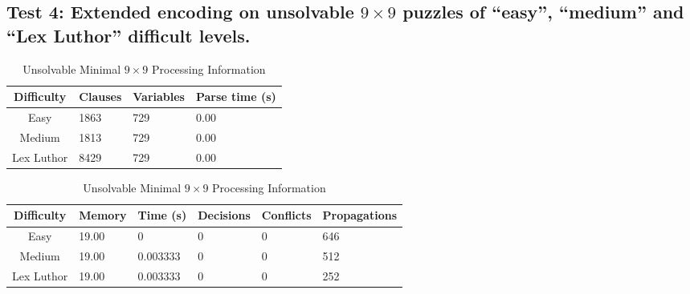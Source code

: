 \documentclass[conference,draftclsnofoot]{IEEEtran}
\begin{document}
\subsection{Test 4: Extended encoding on unsolvable $9 \times 9$ puzzles of ``easy'',
``medium'' and ``Lex Luthor'' difficult levels.}
\FloatBarrier
\begin{table}[!h]
	\centering
	\begin{tabular}{c | l l l}
		Difficulty & Clauses & Variables & Parse time (s) \\\hline
		Easy 		& 1863 & 729 & 0.00 \\
		Medium 		& 1813 & 729 & 0.00 \\
		Lex Luthor 	& 8429 & 729 & 0.00
	\end{tabular}
	\caption{Unsolvable Minimal $9 \times 9$ Parse Information}
	\label{tab:summary}
	\begin{tabular}{c | l l p{20pt} p{20pt}  l }
		Difficulty & Memory & Time (s) & Decisions &
		Conflicts & Propagations \\\hline
		Easy 		& 19.00 & 0 & 0  & 0  & 646 \\
		Medium 		& 19.00 & 0.003333 & 0 & 0  & 512 \\
		Lex Luthor 	& 19.00 & 0.003333 & 0 & 0 & 252
	\end{tabular}
	\caption{Unsolvable Minimal $9 \times 9$ Processing Information}
	\label{tab:summary}
\end{table}
\FloatBarrier

\end{document}
